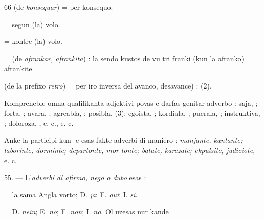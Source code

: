 \begin{VUpage}[70]{66}
 (de \textit{konsequar}) = per konsequo.

 = segun (la) volo.

 = kontre (la) volo.

 = (de \textit{afrankar, afrankita}) : la sendo kustos\nl
de vu tri franki (kun la afranko) afrankite.

 (de la prefixo \textit{retro}) = per iro inversa del avanco,\nl
desavance) :  (2).

Kompreneble omna qualifikanta adjektivi povas e darfas\nl
genitar adverbo : saja, ; forta, ; avara, ;\nl
agreabla, ; posibla,  (3); egoista, ;\nl
kordiala, ; puerala, ; instruktiva, \cc
{}; doloroza, , e. c., e. c.

Anke la participi kun -e esas fakte adverbi di maniero :\nl
\textit{manjante, kantante; laborinte, dorminte; departonte, mor}\cc
\textit{tonte; batate, karezate; ekpulsite, judiciote}, e. c.

\VUblanc{5.86pt}%
55. --- L'\textit{adverbi di afirmo, nego o dubo} esas :

 = la sama Angla vorto; D. \textit{ja}; F. \textit{oui}; I. \textit{si}.

 = D. \textit{nein}; E. \textit{no}; F. \textit{non}; I. \textit{no}. Ol uzesas nur kande\parplein
\end{VUpage}

